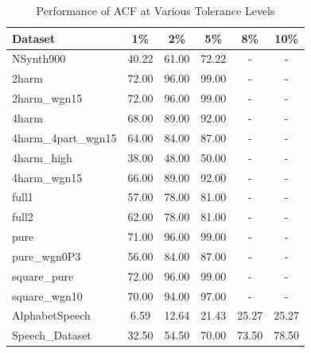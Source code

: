 \documentclass{ieeeaccess}
\begin{document}

\begin{table}[h!]
\centering
\begin{tabular}{lccccc}
\hline
\textbf{Dataset} & \textbf{1\%} & \textbf{2\%} & \textbf{5\%} & \textbf{8\%} & \textbf{10\%} \\ \hline
NSynth900 & 40.22 & 61.00 & 72.22 & - & - \\
2harm & 72.00 & 96.00 & 99.00 & - & - \\ 
2harm\_wgn15 & 72.00 & 96.00 & 99.00 & - & - \\
4harm & 68.00 & 89.00 & 92.00 & - & - \\ 
4harm\_4part\_wgn15 & 64.00 & 84.00 & 87.00 & - & - \\ 
4harm\_high & 38.00 & 48.00 & 50.00 & - & - \\ 
4harm\_wgn15 & 66.00 & 89.00 & 92.00 & - & - \\ 
full1 & 57.00 & 78.00 & 81.00 & - & - \\ 
full2 & 62.00 & 78.00 & 81.00 & - & - \\ 
pure & 71.00 & 96.00 & 99.00 & - & - \\ 
pure\_wgn0P3 & 56.00 & 84.00 & 87.00 & - & - \\ 
square\_pure & 72.00 & 96.00 & 99.00 & - & - \\ 
square\_wgn10 & 70.00 & 94.00 & 97.00 & - & - \\ 
AlphabetSpeech & 6.59 & 12.64 & 21.43 & 25.27 & 25.27 \\ 
Speech\_Dataset & 32.50 & 54.50 & 70.00 & 73.50 & 78.50 \\ 
\hline

\end{tabular}
\caption{Performance of ACF at Various Tolerance Levels}
\label{tab:acf_performance}
\end{table}
\end{document}
